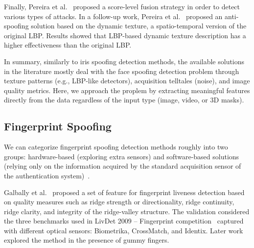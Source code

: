 
Finally, Pereira et al.~\cite{Pereira:ICB:2013} proposed a score-level fusion strategy in order to detect various types of attacks. 
In a follow-up work, Pereira et al.~\cite{Pereira:JIVP:2014} proposed an anti-spoofing solution based on the dynamic texture, a spatio-temporal version of the original LBP. Results showed that LBP-based dynamic texture description has a higher effectiveness than the original LBP.

In summary, similarly to iris spoofing detection methods, the available solutions in the literature mostly deal with the face spoofing detection problem through texture patterns (e.g., LBP-like detectors), acquisition telltales (noise), and image quality metrics. Here, we approach the proplem by extracting meaningful features directly from the data regardless of the input type (image, video, or 3D masks).


\subsection{Fingerprint Spoofing}
We can categorize fingerprint spoofing detection methods roughly into two groups: hardware-based (exploring extra sensors) and software-based solutions (relying only on the information acquired by the standard acquisition sensor of the authentication system)~\cite{Ghiani:ICB:2013}. 


Galbally et al.~\cite{Galbally:BIDS:2009} proposed a set of feature for fingerprint liveness detection based on quality measures such as ridge strength or directionality, ridge continuity, ridge clarity, and integrity of the ridge-valley structure. The validation considered the three benchmarks used in LivDet 2009 -- Fingerprint competition~\cite{Marcialis:ICIAP:2009} captured with different optical sensors: Biometrika, CrossMatch, and Identix. Later work~\cite{Galbally:FGCS:2012} explored the method in the presence of gummy fingers.

